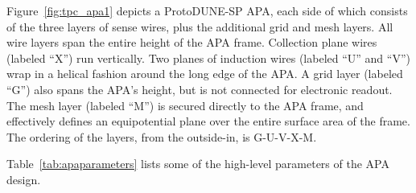 %
Figure~\ref{fig:tpc_apa1} depicts a ProtoDUNE-SP APA, each  side of which consists of the three layers of sense wires, plus the additional grid and mesh layers.  All wire layers span the entire height of the APA frame. Collection plane wires (labeled ``X'') run vertically.  Two planes of induction wires (labeled ``U'' and ``V'') wrap in a helical fashion around the long edge of the APA.  A grid layer (labeled ``G'') also spans the APA's height, but is not connected for electronic readout.  The mesh layer (labeled ``M'') is secured directly to the APA frame, and effectively defines an equipotential plane over the entire surface area of the frame.  The ordering of the layers, from the outside-in, is G-U-V-X-M. 

Table~\ref{tab:apaparameters} lists some of the high-level parameters of the APA design.

